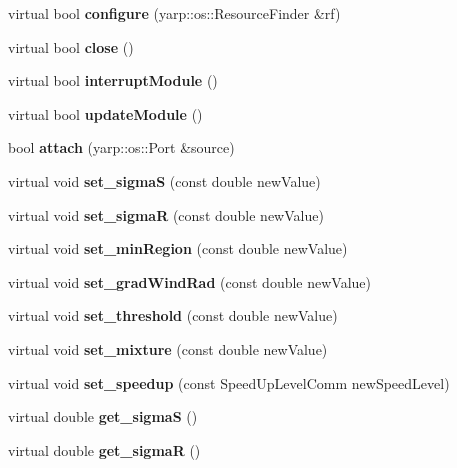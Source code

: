 \begin{DoxyCompactItemize}
\item 
\mbox{\label{classEdisonSegmModule_adff5acfcb2411234172937f50071f747}} 
virtual bool {\bfseries configure} (yarp\+::os\+::\+Resource\+Finder \&rf)
\item 
\mbox{\label{classEdisonSegmModule_a01831b02110aa3c2dfb2ae2a235f32c8}} 
virtual bool {\bfseries close} ()
\item 
\mbox{\label{classEdisonSegmModule_a050c4fd290134b2c549f1f255b39e3fa}} 
virtual bool {\bfseries interrupt\+Module} ()
\item 
\mbox{\label{classEdisonSegmModule_a9ec945c0f1cd4246d94255c9d58bbd4f}} 
virtual bool {\bfseries update\+Module} ()
\item 
\mbox{\label{classEdisonSegmModule_a1ac9b550e805a1e1dff863205b70e553}} 
bool {\bfseries attach} (yarp\+::os\+::\+Port \&source)
\item 
\mbox{\label{classEdisonSegmModule_a9331b900b7671ad851f9aa3b4159e0cf}} 
virtual void {\bfseries set\+\_\+sigmaS} (const double new\+Value)
\item 
\mbox{\label{classEdisonSegmModule_a26d36ebd0382e29033d6b4764b1cfb33}} 
virtual void {\bfseries set\+\_\+sigmaR} (const double new\+Value)
\item 
\mbox{\label{classEdisonSegmModule_a9f4a7a594ff5ee50d330cb964dd9b48f}} 
virtual void {\bfseries set\+\_\+min\+Region} (const double new\+Value)
\item 
\mbox{\label{classEdisonSegmModule_a6add88774ea4794f278988a44d4a64c2}} 
virtual void {\bfseries set\+\_\+grad\+Wind\+Rad} (const double new\+Value)
\item 
\mbox{\label{classEdisonSegmModule_a63a8a762fcad79343218570b175b755d}} 
virtual void {\bfseries set\+\_\+threshold} (const double new\+Value)
\item 
\mbox{\label{classEdisonSegmModule_a0993cc82cbd9dfb774e69e40a236787a}} 
virtual void {\bfseries set\+\_\+mixture} (const double new\+Value)
\item 
\mbox{\label{classEdisonSegmModule_af35d584ee6446611e1c483897c86f1fc}} 
virtual void {\bfseries set\+\_\+speedup} (const Speed\+Up\+Level\+Comm new\+Speed\+Level)
\item 
\mbox{\label{classEdisonSegmModule_a62aa5009cad7d09959ed5cdd8c358a90}} 
virtual double {\bfseries get\+\_\+sigmaS} ()
\item 
\mbox{\label{classEdisonSegmModule_ad1045be0e10cd0d40c81396f48e54b9a}} 
virtual double {\bfseries get\+\_\+sigmaR} ()
\item 

\end{DoxyCompactItemize}
